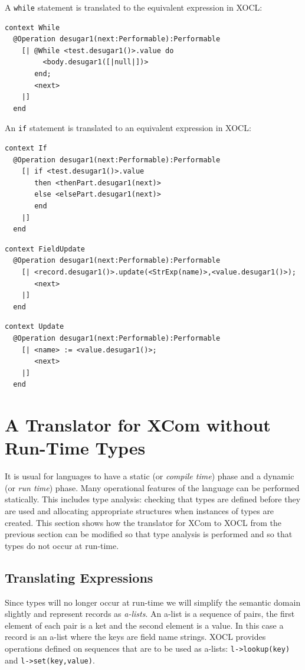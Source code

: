 \documentclass{article}
\begin{document}
A {\tt while} statement is translated to the equivalent expression in XOCL:
\begin{verbatim}
context While
  @Operation desugar1(next:Performable):Performable
    [| @While <test.desugar1()>.value do
         <body.desugar1([|null|])>
       end;
       <next>
    |]
  end
\end{verbatim}
An {\tt if} statement is translated to an equivalent expression in XOCL:
\begin{verbatim}
context If
  @Operation desugar1(next:Performable):Performable
    [| if <test.desugar1()>.value
       then <thenPart.desugar1(next)>
       else <elsePart.desugar1(next)>
       end
    |]
  end
\end{verbatim}

\begin{verbatim}
context FieldUpdate
  @Operation desugar1(next:Performable):Performable
    [| <record.desugar1()>.update(<StrExp(name)>,<value.desugar1()>);
       <next>
    |]
  end
\end{verbatim}

\begin{verbatim}
context Update
  @Operation desugar1(next:Performable):Performable
    [| <name> := <value.desugar1()>;
       <next>
    |]
  end
\end{verbatim}

\section{A Translator for XCom without Run-Time Types}

It is usual for languages to have a static (or {\em compile time}) phase and a dynamic 
(or {\em run time}) phase. Many operational features of the language can be performed 
statically. This includes type analysis: checking that types are defined before they are
used and allocating appropriate structures when instances of types are created. This
section shows how the translator for XCom to XOCL from the previous section can be modified
so that type analysis is performed and so that types do not occur at run-time.

\subsection{Translating Expressions}

Since types will no longer occur at run-time we will simplify the semantic domain slightly
and represent records as {\em a-lists}. An a-list is a sequence of pairs, the first element
of each pair is a ket and the second element is a value. In this case a record is an a-list
where the keys are field name strings. XOCL provides operations defined on sequences that
are to be used as a-lists: {\tt l->lookup(key)} and {\tt l->set(key,value)}.
\end{document}
